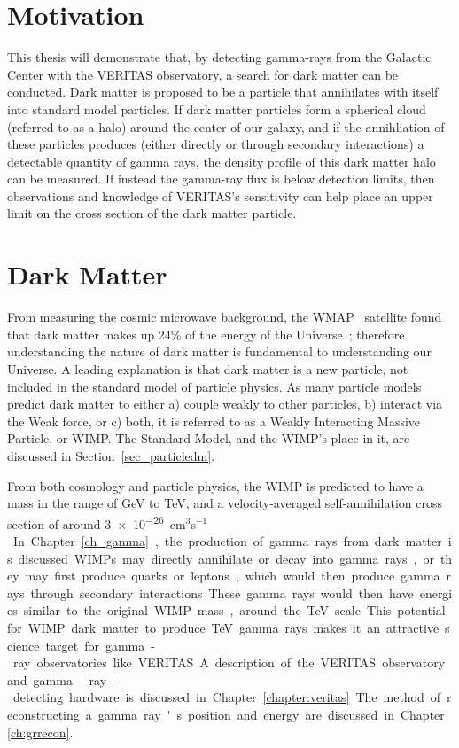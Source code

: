 \section{Motivation}
  This thesis will demonstrate that, by detecting gamma-rays from the Galactic Center with the VERITAS observatory, a search for dark matter can be conducted.
  Dark matter is proposed to be a particle that annihilates with itself into standard model particles.
  If dark matter particles form a spherical cloud (referred to as a halo) around the center of our galaxy, and if the annihliation of these particles produces (either directly or through secondary interactions) a detectable quantity of gamma rays, the density profile of this dark matter halo can be measured.
  If instead the gamma-ray flux is below detection limits, then observations and knowledge of VERITAS's sensitivity can help place an upper limit on the cross section of the dark matter particle.

\section{Dark Matter}

  From measuring the cosmic microwave background, the WMAP~\cite{wmap9year_obs} satellite found that dark matter makes up 24\% of the energy of the Universe~\cite{pdg_2012}; therefore understanding the nature of dark matter is fundamental to understanding our Universe.
  A leading explanation is that dark matter is a new particle, not included in the standard model of particle physics.
  As many particle models predict dark matter to either a) couple weakly to other particles, b) interact via the Weak force, or c) both, it is referred to as a Weakly Interacting Massive Particle, or WIMP.
  The Standard Model, and the WIMP's place in it, are discussed in Section~\ref{sec_particledm}.

  From both cosmology and particle physics, the WIMP is predicted to have a mass in the range of GeV to TeV, and a velocity-averaged self-annihilation cross section of around \nicetilde{}\SI{3e-26}{cm${}^3$s${}^{-1}$}.
  In Chapter~\ref{ch_gamma}, the production of gamma rays from dark matter is discussed.
  WIMPs may directly annihilate or decay into gamma rays, or they may first produce quarks or leptons, which would then produce gamma rays through secondary interactions.
  These gamma rays would then have energies similar to the original WIMP mass, around the TeV scale.
  This potential for WIMP dark matter to produce TeV gamma rays makes it an attractive science target for gamma-ray observatories like VERITAS.
  A description of the VERITAS observatory and gamma-ray-detecting hardware is discussed in Chapter~\ref{chapter:veritas}.
  The method of reconstructing a gamma ray's position and energy are discussed in Chapter~\ref{ch:grrecon}.

